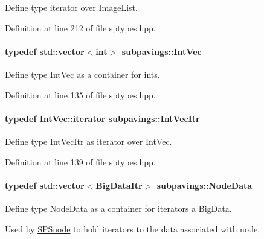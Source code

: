 \-Define type iterator over \-Image\-List. 



\-Definition at line 212 of file sptypes.\-hpp.

\hypertarget{namespacesubpavings_aed8e75b2af342b9c1460431c223dca8e}{
\paragraph[{\-Int\-Vec}]{\setlength{\rightskip}{0pt plus 5cm}typedef std\-::vector$<$int$>$ {\bf subpavings\-::\-Int\-Vec}}}\label{namespacesubpavings_aed8e75b2af342b9c1460431c223dca8e}


\-Define type \-Int\-Vec as a container for ints. 



\-Definition at line 135 of file sptypes.\-hpp.

\hypertarget{namespacesubpavings_ac37614ffc671c9e95013493ff9dc5137}{
\paragraph[{\-Int\-Vec\-Itr}]{\setlength{\rightskip}{0pt plus 5cm}typedef \-Int\-Vec\-::iterator {\bf subpavings\-::\-Int\-Vec\-Itr}}}\label{namespacesubpavings_ac37614ffc671c9e95013493ff9dc5137}


\-Define type \-Int\-Vec\-Itr as iterator over \-Int\-Vec. 



\-Definition at line 139 of file sptypes.\-hpp.

\hypertarget{namespacesubpavings_af005697b49cff9ea37fc3bc9ed19da30}{
\paragraph[{\-Node\-Data}]{\setlength{\rightskip}{0pt plus 5cm}typedef std\-::vector$<${\bf \-Big\-Data\-Itr}$>$ {\bf subpavings\-::\-Node\-Data}}}\label{namespacesubpavings_af005697b49cff9ea37fc3bc9ed19da30}


\-Define type \-Node\-Data as a container for iterators a \-Big\-Data. 

\-Used by \hyperlink{classsubpavings_1_1SPSnode}{\-S\-P\-Snode} to hold iterators to the data associated with node. 

